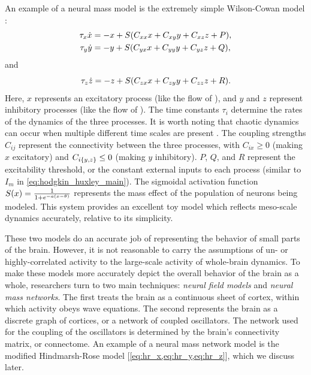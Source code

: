 An example of a neural mass model is the extremely simple Wilson-Cowan model \cite{Wang2012}:
\begin{align}
  \label{eq:wc_x}
  \tau_{x} \dot{x}
  &=
    -x + S \pqty{C_{x x} x + C_{x y} y + C_{x z} z + P}, \\
  \label{eq:wc_y}
  \tau_{y} \dot{y}
  &=
    -y + S \pqty{C_{y x} x + C_{y y} y + C_{y z} z + Q},
\end{align}
and
\begin{equation}
  \label{eq:wc_z}
  \tau_{z} \dot{z}
  =
    -z + S \pqty{C_{z x} x + C_{z y} y + C_{z z} z + R}.
\end{equation}
Here, $x$ represents an excitatory process (like the flow of ), and $y$ and $z$ represent inhibitory processes (like the flow of ).
The time constants $\tau_{i}$ determine the rates of the dynamics of the three processes.
It is worth noting that chaotic dynamics can occur when multiple different time scales are present \cite{Breakspear2017}.
The coupling strengths $C_{i j}$ represent the connectivity between the three processes, with $C_{i x} \geq 0$ (making $x$ excitatory) and $C_{i \Bqty{y, z}} \leq 0$ (making $y$ inhibitory).
$P$, $Q$, and $R$ represent the excitability threshold, or the constant external inputs to each process (similar to $I_{m}$ in \cref{eq:hodgkin_huxley_main}).
The sigmoidal activation function $S(x) = \frac{1}{1 + e^{-a \pqty{x - \theta}}}$ represents the mass effect of the population of neurons being modeled.
This system provides an excellent toy model which reflects meso-scale dynamics accurately, relative to its simplicity.

These two models do an accurate job of representing the behavior of small parts of the brain.
However, it is not reasonable to carry the assumptions of un- or highly-correlated activity to the large-scale activity of whole-brain dynamics.
To make these models more accurately depict the overall behavior of the brain as a whole, researchers turn to two main techniques: \textit{neural field models} and \textit{neural mass networks}.
The first treats the brain as a continuous sheet of cortex, within which activity obeys wave equations.
The second represents the brain as a discrete graph of cortices, or a network of coupled oscillators.
The network used for the coupling of the oscillators is determined by the brain's connectivity matrix, or connectome.
An example of a neural mass network model is the modified Hindmarsh-Rose model [\cref{eq:hr_x,eq:hr_y,eq:hr_z}], which we discuss later.

